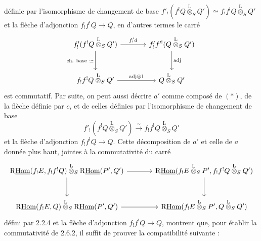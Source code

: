 définie par l'isomorphisme de changement de base $f'_!(f^!Q\overset{\mathrm{L}}{\otimes}_SQ')\simeq f_!f^!Q\overset{\mathrm{L}}{\otimes}_SQ'$ et la flèche d'adjonction $f_!f^!Q\to Q$, en d'autres termes le carré
\[
\begin{tikzcd}[column sep=large,row sep=large]
f'_!(f^!Q\overset{\mathrm{L}}{\otimes}_SQ') \arrow[r,"{f'_!d}"] \arrow[d,"{\text{ch. base}\ \simeq}"'] & f'_!f'^!(Q\overset{\mathrm{L}}{\otimes}_SQ') \arrow[d,"\mathrm{adj}"]\\
f_!f^!Q\overset{\mathrm{L}}{\otimes}_SQ' \arrow[r,"{\mathrm{adj}\otimes 1}"] & Q\overset{\mathrm{L}}{\otimes}_SQ'
\end{tikzcd}
\]
est commutatif. Par suite, on peut aussi décrire $a'$ comme composé de $(*)$, de la flèche définie par $c$, et de celles définies par l'isomorphisme de changement de base
\[
f'_!(f^!Q\overset{\mathrm{L}}{\otimes}_SQ')\xrightarrow{\sim}f_!f^!Q\overset{\mathrm{L}}{\otimes}_SQ'
\]
et la flèche d'adjonction $f_!f^!Q\to Q$. Cette décomposition de $a'$ et celle de $a$ donnée plus haut, jointes à la commutativité du carré
\[
\begin{tikzcd}[column sep=
large,row sep=large]
\mathrm{R}\underline{\mathrm{Hom}}(f_!E,f_!f^!Q)\overset{\mathrm{L}}{\otimes}_S\mathrm{R}\underline{\mathrm{Hom}}(P',Q') \arrow[r] \arrow[d] & \mathrm{R}\underline{\mathrm{Hom}}(f_!E\overset{\mathrm{L}}{\otimes}_SP',f_!f^!Q\overset{\mathrm{L}}{\otimes}_SQ') \arrow[d]\\
\mathrm{R}\underline{\mathrm{Hom}}(f_!E,Q)\overset{\mathrm{L}}{\otimes}_S\mathrm{R}\underline{\mathrm{Hom}}(P',Q') \arrow[r] & \mathrm{R}\underline{\mathrm{Hom}}(f_!E\overset{\mathrm{L}}{\otimes}_SP',Q\overset{\mathrm{L}}{\otimes}_SQ')
\end{tikzcd}
\]
défini par 2.2.4 et la flèche d'adjonction $f_!f^!Q\to Q$, montrent que, pour établir la commutativité de 2.6.2, il suffit de prouver la compatibilité suivante :

